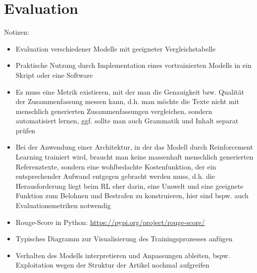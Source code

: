 \section{Evaluation}
Notizen:
\begin{itemize}
	\item Evaluation verschiedener Modelle mit geeigneter Vergleichstabelle
	\item Praktische Nutzung durch Implementation eines vortrainierten Modells in ein Skript oder eine Software
	\item Es muss eine Metrik existieren, mit der man die Genauigkeit bzw. Qualität der Zusammenfassung messen kann, d.h. man möchte die Texte nicht mit menschlich generierten Zusammenfassungen vergleichen, sondern automatisiert lernen, ggf. sollte man auch Grammatik und Inhalt separat prüfen
	\item Bei der Anwendung einer Architektur, in der das Modell durch Reinforcement Learning trainiert wird, braucht man keine massenhaft menschlich generierten Referenztexte, sondern eine wohlbedachte Kostenfunktion, der ein entsprechender Aufwand entgegen gebracht werden muss, d.h. die Herausforderung liegt beim RL eher darin, eine Umwelt und eine geeignete Funktion zum Belohnen und Bestrafen zu konstruieren, hier sind bspw. auch Evaluationsmetriken notwendig
	\item Rouge-Score in Python: \url{https://pypi.org/project/rouge-score/}
	\item Typisches Diagramm zur Visualisierung des Trainingsprozesses anfügen
	\item Verhalten des Modells interpretieren und Anpassungen ableiten, bspw. Exploitation wegen der Struktur der Artikel nochmal aufgreifen
\end{itemize}
